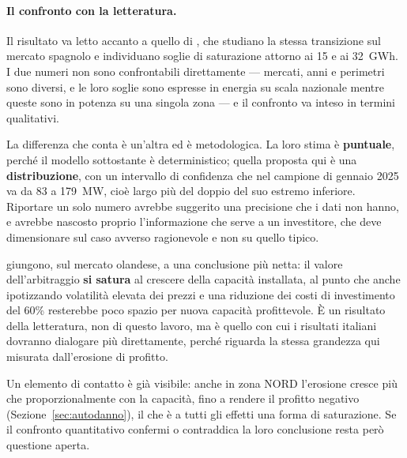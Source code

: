 
\paragraph{Il confronto con la letteratura.} Il risultato va letto accanto a quello di
\textcite{alonsoperez2026storage}, che studiano la stessa transizione sul mercato spagnolo e
individuano soglie di saturazione attorno ai 15 e ai 32~GWh. I due numeri non sono
confrontabili direttamente — mercati, anni e perimetri sono diversi, e le loro soglie sono
espresse in energia su scala nazionale mentre queste sono in potenza su una singola zona — e
il confronto va inteso in termini qualitativi.

La differenza che conta \`e un'altra ed \`e metodologica. La loro stima \`e \textbf{puntuale},
perch\'e il modello sottostante \`e deterministico; quella proposta qui \`e una
\textbf{distribuzione}, con un intervallo di confidenza che nel campione di gennaio 2025 va da
83 a 179~MW, cio\`e largo pi\`u del doppio del suo estremo inferiore. Riportare un solo numero
avrebbe suggerito una precisione che i dati non hanno, e avrebbe nascosto proprio
l'informazione che serve a un investitore, che deve dimensionare sul caso avverso ragionevole
e non su quello tipico.

\textcite{veenstra2025profitability} giungono, sul mercato olandese, a una conclusione pi\`u
netta: il valore dell'arbitraggio \textbf{si satura} al crescere della capacit\`a installata, al
punto che anche ipotizzando volatilit\`a elevata dei prezzi e una riduzione dei costi di
investimento del 60\% resterebbe poco spazio per nuova capacit\`a profittevole. \`E un risultato
della letteratura, non di questo lavoro, ma \`e quello con cui i risultati italiani dovranno
dialogare pi\`u direttamente, perch\'e riguarda la stessa grandezza qui misurata dall'erosione
di profitto.

Un elemento di contatto \`e gi\`a visibile: anche in zona NORD l'erosione cresce pi\`u che
proporzionalmente con la capacit\`a, fino a rendere il profitto negativo
(Sezione~\ref{sec:autodanno}), il che \`e a tutti gli effetti una forma di saturazione. Se il
confronto quantitativo confermi o contraddica la loro conclusione resta per\`o questione aperta.

